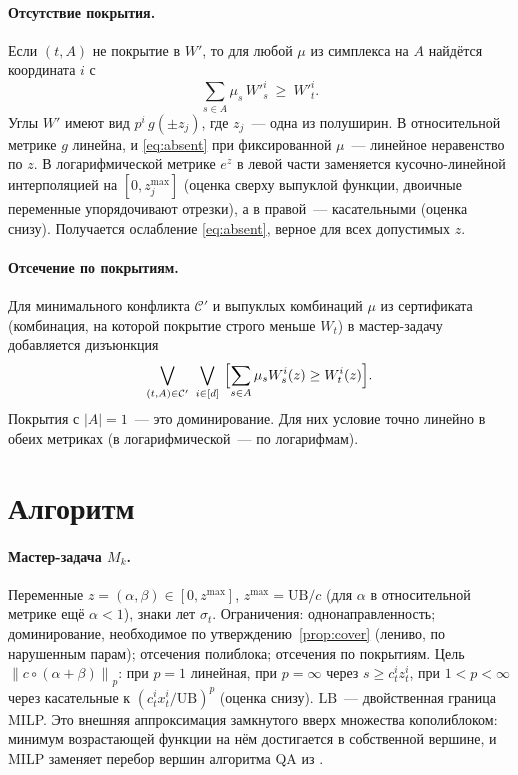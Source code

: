 \documentclass[a4paper,11pt]{article}
\theoremstyle{plain}
\theoremstyle{definition}
\theoremstyle{remark}
\newcommand{\abs}[1]{\left\lvert #1 \right\rvert}
\newcommand{\norm}[1]{\left\lVert #1 \right\rVert}
\newcommand{\LB}{\mathrm{LB}}
\newcommand{\UB}{\mathrm{UB}}
\begin{document}
\paragraph{Отсутствие покрытия.} Если $(t,A)$ не покрытие в $W'$, то для любой $\mu$ из симплекса на $A$ найдётся координата $i$ с
\begin{equation}\label{eq:absent}
    \sum_{s\in A}\mu_s\,W'^i_s\ \ge\ W'^i_t.
\end{equation}
Углы $W'$ имеют вид $p^i\,g(\pm z_j)$, где $z_j$~--- одна из полуширин. В относительной метрике $g$ линейна, и \eqref{eq:absent} при фиксированной $\mu$~--- линейное неравенство по $z$. В логарифмической метрике $e^{z}$ в левой части заменяется кусочно-линейной интерполяцией на $[0,z^{\max}_j]$ (оценка сверху выпуклой функции, двоичные переменные упорядочивают отрезки), а в правой~--- касательными (оценка снизу). Получается ослабление \eqref{eq:absent}, верное для всех допустимых $z$.

\paragraph{Отсечение по покрытиям.} Для минимального конфликта $\mathcal C'$ и выпуклых комбинаций $\mu$ из сертификата (комбинация, на которой покрытие строго меньше $W_t$) в мастер-задачу добавляется дизъюнкция
\[
    \bigvee_{(t,A)\in\mathcal C'}\ \bigvee_{i\in[d]}\ \Bigl[\sum_{s\in A}\mu_sW^i_s(z)\ge W^i_t(z)\Bigr].
\]
Покрытия с $\abs A=1$~--- это доминирование. Для них условие точно линейно в обеих метриках (в логарифмической~--- по логарифмам).

\section{Алгоритм}

\paragraph{Мастер-задача $M_k$.} Переменные $z=(\alpha,\beta)\in[0,z^{\max}]$, $z^{\max}=\UB/c$ (для $\alpha$ в относительной метрике ещё $\alpha<1$), знаки лет $\sigma_t$. Ограничения: однонаправленность; доминирование, необходимое по утверждению~\ref{prop:cover} (лениво, по нарушенным парам); отсечения полиблока; отсечения по покрытиям. Цель $\norm{c\circ(\alpha+\beta)}_p$: при $p=1$ линейная, при $p=\infty$ через $s\ge c^i_tz^i_t$, при $1<p<\infty$ через касательные к $(c^i_tx^i_t/\UB)^p$ (оценка снизу). $\LB$~--- двойственная граница MILP. Это внешняя аппроксимация замкнутого вверх множества кополиблоком: минимум возрастающей функции на нём достигается в собственной вершине, и MILP заменяет перебор вершин алгоритма QA из \cite{TuyAlKhayyalThach2005}.
\end{document}
